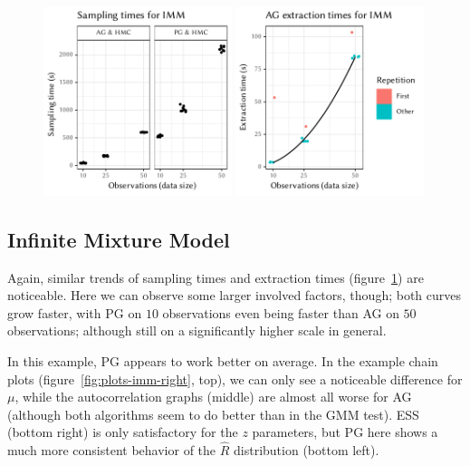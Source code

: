 \cleartoverso
\FloatBlock

\begin{figure}[t!]
  \centering
  \includegraphics[width=0.49\textwidth]{figures/IMM-sampling_times}
  \includegraphics[width=0.49\textwidth]{figures/IMM-compile_times}
  \caption{}
  \label{fig:plots-imm-left}
\end{figure}


\subsection*{Infinite Mixture Model}

Again, similar trends of sampling times and extraction times (figure~\ref{fig:plots-imm-left}) are
noticeable.  Here we can observe some larger involved factors, though; both curves grow faster, with
PG on \(10\) observations even being faster than AG on \(50\) observations; although still on a
significantly higher scale in general.

In this example, PG appears to work better on average.  In the example chain plots
(figure~\ref{fig:plots-imm-right}, top), we can only see a noticeable difference for \(\mu\), while the
autocorrelation graphs (middle) are almost all worse for AG (although both algorithms seem to do
better than in the GMM test).  ESS (bottom right) is only satisfactory for the \(z\) parameters, but
PG here shows a much more consistent behavior of the \(\widehat{R}\) distribution (bottom left).

